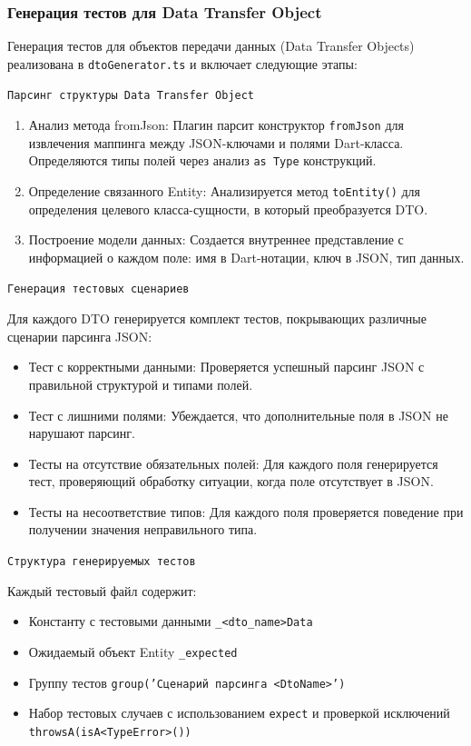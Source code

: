 \documentclass[14pt, russian]{scrartcl}
\begin{document}
\subsubsection{Генерация тестов для Data Transfer Object}

Генерация тестов для объектов передачи данных (Data Transfer Objects) реализована в \texttt{dtoGenerator.ts} и включает следующие этапы:

\texttt{Парсинг структуры Data Transfer Object}

\begin{enumerate}
    \item Анализ метода fromJson: Плагин парсит конструктор \texttt{fromJson} для извлечения маппинга между JSON-ключами и полями Dart-класса. Определяются типы полей через анализ \texttt{as Type} конструкций.
    \item Определение связанного Entity: Анализируется метод \texttt{toEntity()} для определения целевого класса-сущности, в который преобразуется DTO.
    \item Построение модели данных: Создается внутреннее представление с информацией о каждом поле: имя в Dart-нотации, ключ в JSON, тип данных.
\end{enumerate}

\texttt{Генерация тестовых сценариев}

Для каждого DTO генерируется комплект тестов, покрывающих различные сценарии парсинга JSON:

\begin{itemize}
    \item Тест с корректными данными: Проверяется успешный парсинг JSON с правильной структурой и типами полей.
    \item Тест с лишними полями: Убеждается, что дополнительные поля в JSON не нарушают парсинг.
    \item Тесты на отсутствие обязательных полей: Для каждого поля генерируется тест, проверяющий обработку ситуации, когда поле отсутствует в JSON.
    \item Тесты на несоответствие типов: Для каждого поля проверяется поведение при получении значения неправильного типа.
\end{itemize}

\texttt{Структура генерируемых тестов}

Каждый тестовый файл содержит:
\begin{itemize}
    \item Константу с тестовыми данными \texttt{\_<dto\_name>Data}
    \item Ожидаемый объект Entity \texttt{\_expected}
    \item Группу тестов \texttt{group('Сценарий парсинга <DtoName>')}
    \item Набор тестовых случаев с использованием \texttt{expect} и проверкой исключений \texttt{throwsA(isA<TypeError>())}
\end{itemize}
\end{document}
